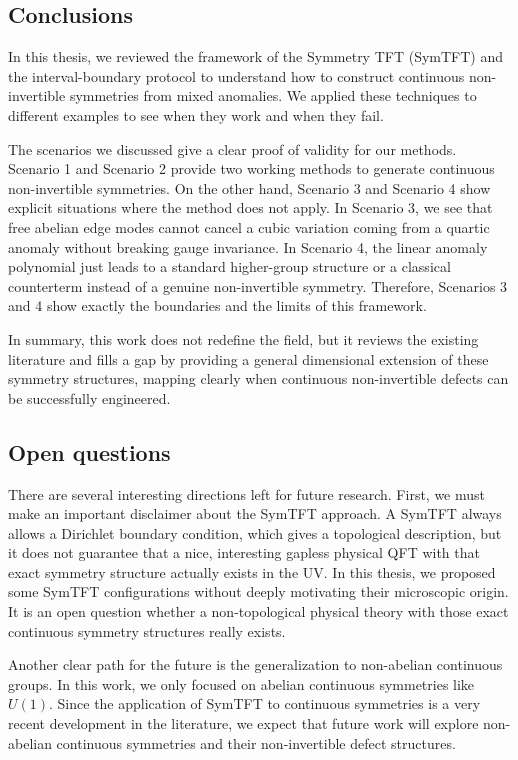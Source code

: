 \documentclass[aps,preprint,nofootinbib,preprintnumbers,eqsecnum,superscriptaddress]{revtex4}
\numberwithin{equation}{section}
\begin{document}
\subsection{Conclusions}
\label{sec:conclusions}

In this thesis, we reviewed the framework of the Symmetry TFT (SymTFT) and the interval-boundary protocol to understand how to construct continuous non-invertible symmetries from mixed anomalies. We applied these techniques to different examples to see when they work and when they fail.

The scenarios we discussed give a clear proof of validity for our methods. Scenario 1 and Scenario 2 provide two working methods to generate continuous non-invertible symmetries. On the other hand, Scenario 3 and Scenario 4 show explicit situations where the method does not apply. In Scenario 3, we see that free abelian edge modes cannot cancel a cubic variation coming from a quartic anomaly without breaking gauge invariance. In Scenario 4, the linear anomaly polynomial just leads to a standard higher-group structure or a classical counterterm instead of a genuine non-invertible symmetry. Therefore, Scenarios 3 and 4 show exactly the boundaries and the limits of this framework.

In summary, this work does not redefine the field, but it reviews the existing literature and fills a gap by providing a general dimensional extension of these symmetry structures, mapping clearly when continuous non-invertible defects can be successfully engineered.


\subsection{Open questions}
\label{sec:open_questions}

There are several interesting directions left for future research. First, we must make an important disclaimer about the SymTFT approach. A SymTFT always allows a Dirichlet boundary condition, which gives a topological description, but it does not guarantee that a nice, interesting gapless physical QFT with that exact symmetry structure actually exists in the UV. In this thesis, we proposed some SymTFT configurations without deeply motivating their microscopic origin. It is an open question whether a non-topological physical theory with those exact continuous symmetry structures really exists.

Another clear path for the future is the generalization to non-abelian continuous groups. In this work, we only focused on abelian continuous symmetries like $U(1)$. Since the application of SymTFT to continuous symmetries is a very recent development in the literature, we expect that future work will explore non-abelian continuous symmetries and their non-invertible defect structures.
\end{document}
